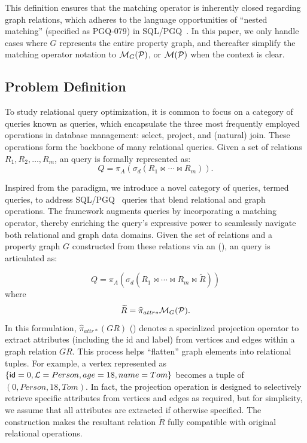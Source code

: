 This definition ensures that the matching operator is inherently closed regarding graph relations,
which adheres to the language opportunities of ``nested matching'' (specified as PGQ-079) in SQL/PGQ~\cite{sql-pgq}.
In this paper, we only handle cases where $G$ represents the entire property graph, and thereafter simplify the matching operator notation to $\mathcal{M}_G(\mathcal{P})$, or $\mathcal{M}(\mathcal{P})$ when the context is clear.

\subsection{Problem Definition}
\label{sec:problem-definition}

To study relational query optimization, it is common to focus on a category of queries known as \spj queries,
which encapsulate the three most frequently employed operations in database management: select, project, and (natural) join.
These operations form the backbone of many relational queries. Given a set of relations \(R_1, R_2, \ldots, R_m\),
an \spj query is formally represented as:
\[
Q = \pi_A(\sigma_d(R_1 \Join \cdots \Join R_m)).
\]

Inspired from the \spj paradigm, we introduce a novel category of queries, termed \spjm queries, to address SQL/PGQ~\cite{sql-pgq} queries that
blend relational and graph operations. The \spjm framework augments \spj queries by incorporating a matching operator, thereby enriching the query's expressive power to seamlessly navigate both relational and graph data domains.
Given the set of relations and a property graph \(G\) constructed from these relations via an \rgmapping (),
an \spjm query is articulated as:

\begin{equation}
    \label{eq:spjm}
Q = \pi_A(\sigma_d(R_1 \Join \cdots \Join R_m \Join \widetilde{R}))
\end{equation}
where
\[
\widetilde{R} = \widehat{\pi}_{attr*}\mathcal{M}_G(\mathcal{P}).
\]
In this formulation, \(\widehat{\pi}_{attr*}(GR)\) () denotes a specialized projection operator to extract attributes (including the id and label)
from vertices and edges within a graph relation $GR$.
This process helps ``flatten'' graph elements into relational tuples.
For example, a vertex represented as \(\{{\mathsf{id}}=0, \mathcal{L}=Person, age=18, name=Tom\}\) becomes a tuple of \((0, Person, 18, Tom)\).
In fact, the projection operation is designed to selectively retrieve specific attributes from vertices and edges as required, but for simplicity, we assume that all attributes are extracted if otherwise specified.
The construction makes the resultant relation \(\tilde{R}\) fully compatible with original relational operations.


